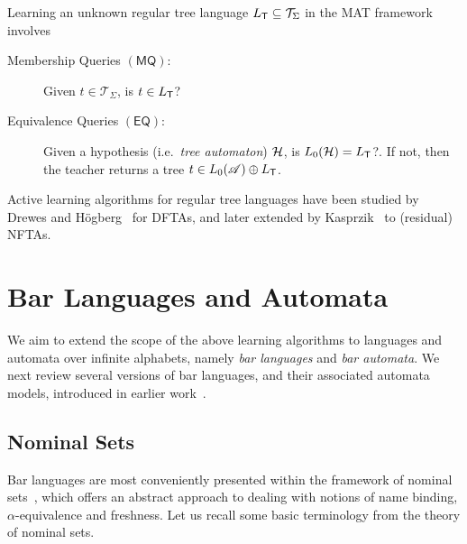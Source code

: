 \documentclass[a4paper,UKenglish,cleveref,autoref,thm-restate,numberwithinsect,final]{lipics-v2021}
\begin{document}
Learning an unknown regular tree language $L_\textsf{T}\subseteq \mathcal{T}_\Sigma$ in the MAT framework involves
    \begin{description}
        \item[Membership Queries $(\textsf{MQ})$:] Given $t\in \mathcal{T}_\Sigma$, is $t\in L_\textsf{T}$?
        \item[Equivalence Queries $(\textsf{EQ})$:] Given a hypothesis (i.e.~\emph{tree automaton}) $\mathcal{H}$,
            is $L_0(\mathcal{H})=L_\textsf{T}$?. If not, then the teacher returns a tree $t\in L_0(\mathscr{A})\oplus L_\textsf{T}$.
    \end{description}
    Active learning algorithms for regular tree languages have been studied by Drewes and
    Högberg~\cite{dh03} for DFTAs, and later extended by
    Kasprzik~\cite{k13} to (residual) NFTAs.


\section{Bar Languages and Automata}\label{sec:prelim}
We aim to extend the scope of the above learning algorithms to languages and automata over infinite alphabets, namely \emph{bar languages} and \emph{bar automata}. We next review several versions of bar languages, and their associated automata models, introduced in earlier work~\cite{skmw17,uhms21,ps24}. 

\subsection{Nominal Sets}
Bar languages are most conveniently presented within the framework of nominal sets~\cite{Pitts2013}, which offers an abstract approach to dealing with notions of name binding, $\alpha$-equivalence and freshness. Let us recall some basic terminology from the theory of nominal sets.
\end{document}
